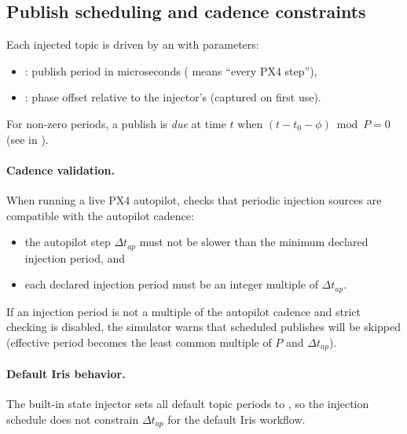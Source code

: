 \subsection{Publish scheduling and cadence constraints}
\label{sec:uorb-scheduling}

Each injected topic is driven by an  with parameters:
\begin{itemize}[leftmargin=*,itemsep=2pt]
  \item {}: publish period in microseconds ( means ``every PX4 step''),
  \item {}: phase offset relative to the injector's  (captured on first use).
\end{itemize}
For non-zero periods, a publish is \emph{due} at time \(t\) when \((t - t_0 - \phi) \bmod P = 0\) (see  in ).

\paragraph{Cadence validation.}
When running a live PX4 autopilot,  checks that periodic injection sources are compatible with the autopilot cadence:\vspace{-2pt}
\begin{itemize}[leftmargin=*,itemsep=2pt]
  \item the autopilot step \(\Delta t_{ap}\) must not be slower than the minimum declared injection period, and
  \item each declared injection period must be an integer multiple of \(\Delta t_{ap}\).
\end{itemize}
If an injection period is not a multiple of the autopilot cadence and strict checking is disabled, the simulator warns that scheduled publishes will be skipped (effective period becomes the least common multiple of \(P\) and \(\Delta t_{ap}\)).

\paragraph{Default Iris behavior.}
The built-in state injector sets all default topic periods to , so the injection schedule does not constrain \(\Delta t_{ap}\) for the default Iris workflow.
